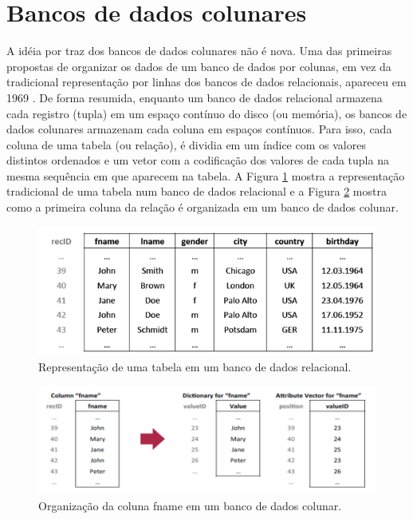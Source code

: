 \section{Bancos de dados colunares}
A idéia por traz dos bancos de dados colunares não é nova. Uma das primeiras propostas de organizar os dados de um banco de dados por colunas, em vez da tradicional representação por linhas dos bancos de dados relacionais, apareceu em 1969 \cite{Estabrook1969327}. De forma resumida, enquanto um banco de dados relacional armazena cada registro (tupla) em um espaço contínuo do disco (ou memória), os bancos de dados colunares armazenam cada coluna em espaços contínuos. Para isso, cada coluna de uma tabela (ou relação), é dividia em um índice com os valores distintos ordenados e um vetor com a codificação dos valores de cada tupla na mesma sequência em que aparecem na tabela. A Figura \ref{fig:tabular} mostra a representação tradicional de uma tabela num banco de dados relacional e a Figura \ref{fig:colunar} mostra como a primeira coluna da relação é organizada em um banco de dados colunar.

\begin{figure}
	\centering
	\includegraphics[width=\linewidth]{./colunar_repr_tabela.png}
	\caption{Representação de uma tabela em um banco de dados relacional.}
	\label{fig:tabular}
\end{figure}

\begin{figure}
	\centering
	\includegraphics[width=\linewidth]{./colunar_repr_coluna.png}
	\caption{Organização da coluna fname em um banco de dados colunar.}
	\label{fig:colunar}
\end{figure}

